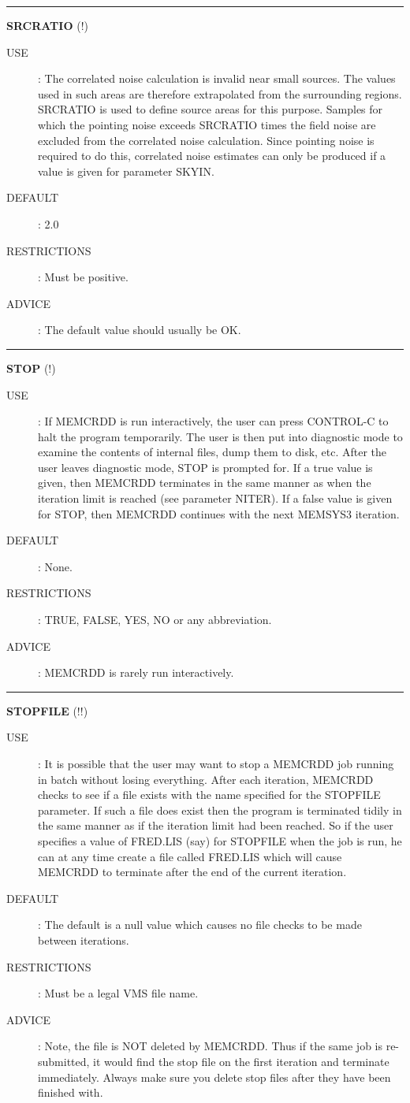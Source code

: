 \rule{\textwidth}{0.3mm}
{\Large {\bf SRCRATIO} (!)}
\begin{description}
\item [USE]:
The correlated noise calculation is invalid near small sources. The values used 
in such areas are therefore extrapolated from the surrounding regions. SRCRATIO
is used to define source areas for this purpose. Samples for which the 
pointing noise exceeds SRCRATIO times the field noise are excluded from the 
correlated noise calculation. Since pointing noise is required to do this, 
correlated noise estimates can only be produced if a value is given for 
parameter SKYIN.
\item [DEFAULT]:
2.0
\item [RESTRICTIONS]:
Must be positive.
\item [ADVICE]:
The default value should usually be OK.
\end {description}

\rule{\textwidth}{0.3mm}
{\Large {\bf STOP } (!)}
\begin{description}
\item [USE]:
If MEMCRDD is run interactively, the user can press CONTROL-C to halt the 
program temporarily. The user is then put into diagnostic mode to examine the 
contents of internal files, dump them to disk, etc. After the user leaves 
diagnostic mode, STOP is prompted for. If a true value is given, then MEMCRDD 
terminates in the same manner as when the iteration limit is reached (see 
parameter NITER). If a false value is given for STOP, then MEMCRDD continues 
with the next MEMSYS3 iteration.
\item [DEFAULT]:
None.
\item [RESTRICTIONS]:
TRUE, FALSE, YES, NO or any abbreviation.
\item [ADVICE]:
MEMCRDD is rarely run interactively.
\end {description}

\rule{\textwidth}{0.3mm}
{\Large {\bf STOPFILE} (!!)}
\begin{description}
\item [USE]:
It is possible that the user may want to stop a MEMCRDD job running in batch 
without losing everything. After each iteration, MEMCRDD checks to see if a file 
exists with the name specified for the STOPFILE parameter. If such a file does 
exist then the program is terminated tidily in the same manner as if the 
iteration limit had been reached. So if the user specifies a value of FRED.LIS 
(say) for STOPFILE when the job is run, he can at any time create a file called 
FRED.LIS which will cause MEMCRDD to terminate after the end of the current 
iteration.
\item [DEFAULT]:
The default is a null value which causes no file checks to be made between 
iterations.
\item [RESTRICTIONS]:
Must be a legal VMS file name.
\item [ADVICE]:
Note, the file is NOT deleted by MEMCRDD. Thus if the same job is re-submitted, 
it would find the stop file on the first iteration and terminate immediately. 
Always make sure you delete stop files after they have been finished with.
\end {description}

